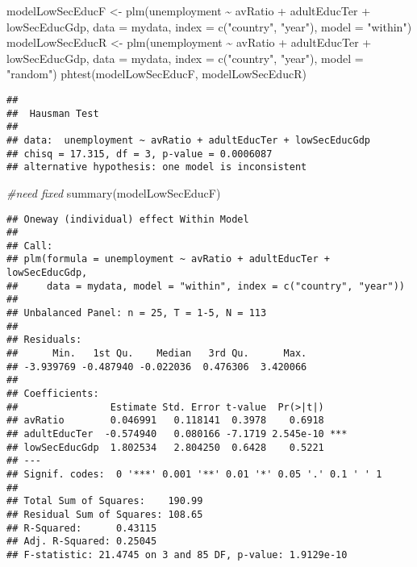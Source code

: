 \documentclass[
]{article}
\newenvironment{Shaded}{\begin{snugshade}}{\end{snugshade}}
\newcommand{\AttributeTok}[1]{\textcolor[rgb]{0.77,0.63,0.00}{#1}}
\newcommand{\CommentTok}[1]{\textcolor[rgb]{0.56,0.35,0.01}{\textit{#1}}}
\newcommand{\FunctionTok}[1]{\textcolor[rgb]{0.00,0.00,0.00}{#1}}
\newcommand{\NormalTok}[1]{#1}
\newcommand{\OtherTok}[1]{\textcolor[rgb]{0.56,0.35,0.01}{#1}}
\newcommand{\SpecialCharTok}[1]{\textcolor[rgb]{0.00,0.00,0.00}{#1}}
\newcommand{\StringTok}[1]{\textcolor[rgb]{0.31,0.60,0.02}{#1}}
\begin{document}
\begin{Shaded}
\begin{Highlighting}[]
\NormalTok{modelLowSecEducF }\OtherTok{\textless{}{-}} \FunctionTok{plm}\NormalTok{(unemployment }\SpecialCharTok{\textasciitilde{}}\NormalTok{  avRatio }\SpecialCharTok{+}\NormalTok{ adultEducTer }\SpecialCharTok{+}\NormalTok{ lowSecEducGdp,}
             \AttributeTok{data =}\NormalTok{ mydata, }\AttributeTok{index =} \FunctionTok{c}\NormalTok{(}\StringTok{"country"}\NormalTok{, }\StringTok{"year"}\NormalTok{), }\AttributeTok{model =} \StringTok{"within"}\NormalTok{)}
\NormalTok{modelLowSecEducR }\OtherTok{\textless{}{-}} \FunctionTok{plm}\NormalTok{(unemployment }\SpecialCharTok{\textasciitilde{}}\NormalTok{  avRatio }\SpecialCharTok{+}\NormalTok{ adultEducTer }\SpecialCharTok{+}\NormalTok{ lowSecEducGdp,}
             \AttributeTok{data =}\NormalTok{ mydata, }\AttributeTok{index =} \FunctionTok{c}\NormalTok{(}\StringTok{"country"}\NormalTok{, }\StringTok{"year"}\NormalTok{), }\AttributeTok{model =} \StringTok{"random"}\NormalTok{)}
\FunctionTok{phtest}\NormalTok{(modelLowSecEducF, modelLowSecEducR)}
\end{Highlighting}
\end{Shaded}

\begin{verbatim}
## 
##  Hausman Test
## 
## data:  unemployment ~ avRatio + adultEducTer + lowSecEducGdp
## chisq = 17.315, df = 3, p-value = 0.0006087
## alternative hypothesis: one model is inconsistent
\end{verbatim}

\begin{Shaded}
\begin{Highlighting}[]
\CommentTok{\#need fixed}
\FunctionTok{summary}\NormalTok{(modelLowSecEducF)}
\end{Highlighting}
\end{Shaded}

\begin{verbatim}
## Oneway (individual) effect Within Model
## 
## Call:
## plm(formula = unemployment ~ avRatio + adultEducTer + lowSecEducGdp, 
##     data = mydata, model = "within", index = c("country", "year"))
## 
## Unbalanced Panel: n = 25, T = 1-5, N = 113
## 
## Residuals:
##      Min.   1st Qu.    Median   3rd Qu.      Max. 
## -3.939769 -0.487940 -0.022036  0.476306  3.420066 
## 
## Coefficients:
##                Estimate Std. Error t-value  Pr(>|t|)    
## avRatio        0.046991   0.118141  0.3978    0.6918    
## adultEducTer  -0.574940   0.080166 -7.1719 2.545e-10 ***
## lowSecEducGdp  1.802534   2.804250  0.6428    0.5221    
## ---
## Signif. codes:  0 '***' 0.001 '**' 0.01 '*' 0.05 '.' 0.1 ' ' 1
## 
## Total Sum of Squares:    190.99
## Residual Sum of Squares: 108.65
## R-Squared:      0.43115
## Adj. R-Squared: 0.25045
## F-statistic: 21.4745 on 3 and 85 DF, p-value: 1.9129e-10
\end{verbatim}
\end{document}
